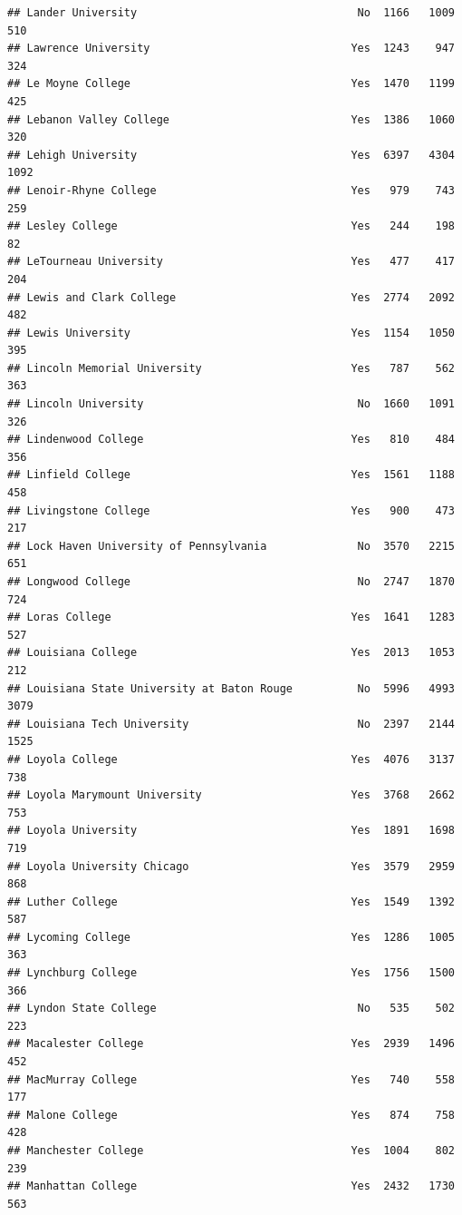 \documentclass[
]{article}
\begin{document}
\begin{verbatim}
## Lander University                                  No  1166   1009    510
## Lawrence University                               Yes  1243    947    324
## Le Moyne College                                  Yes  1470   1199    425
## Lebanon Valley College                            Yes  1386   1060    320
## Lehigh University                                 Yes  6397   4304   1092
## Lenoir-Rhyne College                              Yes   979    743    259
## Lesley College                                    Yes   244    198     82
## LeTourneau University                             Yes   477    417    204
## Lewis and Clark College                           Yes  2774   2092    482
## Lewis University                                  Yes  1154   1050    395
## Lincoln Memorial University                       Yes   787    562    363
## Lincoln University                                 No  1660   1091    326
## Lindenwood College                                Yes   810    484    356
## Linfield College                                  Yes  1561   1188    458
## Livingstone College                               Yes   900    473    217
## Lock Haven University of Pennsylvania              No  3570   2215    651
## Longwood College                                   No  2747   1870    724
## Loras College                                     Yes  1641   1283    527
## Louisiana College                                 Yes  2013   1053    212
## Louisiana State University at Baton Rouge          No  5996   4993   3079
## Louisiana Tech University                          No  2397   2144   1525
## Loyola College                                    Yes  4076   3137    738
## Loyola Marymount University                       Yes  3768   2662    753
## Loyola University                                 Yes  1891   1698    719
## Loyola University Chicago                         Yes  3579   2959    868
## Luther College                                    Yes  1549   1392    587
## Lycoming College                                  Yes  1286   1005    363
## Lynchburg College                                 Yes  1756   1500    366
## Lyndon State College                               No   535    502    223
## Macalester College                                Yes  2939   1496    452
## MacMurray College                                 Yes   740    558    177
## Malone College                                    Yes   874    758    428
## Manchester College                                Yes  1004    802    239
## Manhattan College                                 Yes  2432   1730    563

\end{verbatim}
\end{document}
